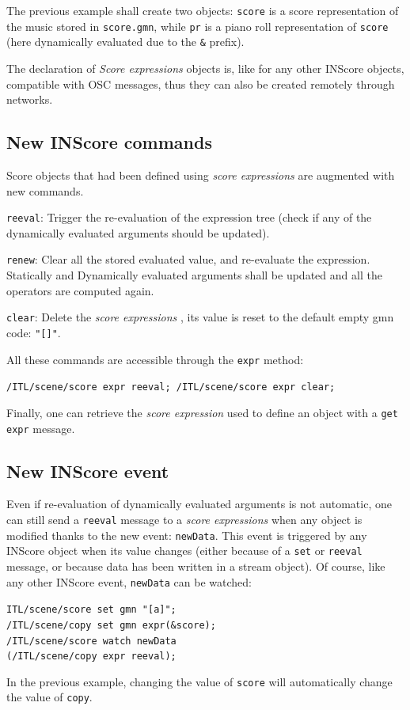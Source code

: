 \documentclass{article}
\newcommand{\OSC}[1]{\texttt{#1}}
\newcommand{\sExpr}{\emph{score expressions} }
\newcommand{\SExpr}{\emph{Score expressions} }
\let\olditemize\itemize
\let\oldenditemize\enditemize
\renewenvironment{itemize} 	{\olditemize \setlength{\itemsep}{1mm}}{\oldenditemize}
\newcommand{\sample}	[1]			{\vspace{-1.8em}\begin{center}\colorbox{mygrey}{\begin{minipage}[t]{1\columnwidth} {\small \texttt{#1}}\end{minipage}}\end{center}}
\begin{document}
The previous example shall create two objects: \OSC{score} is a score representation of the music stored in \OSC{score.gmn}, while \OSC{pr} is a piano roll representation of \OSC{score} (here dynamically evaluated due to the \OSC{\&} prefix).

The declaration of \SExpr objects is, like for any other INScore objects, compatible with OSC messages, thus they can also be created remotely through networks. 

\subsection{New INScore commands}
Score objects that had been defined using \sExpr are augmented with new commands.

\begin{itemize}
\item \OSC{reeval}: Trigger the re-evaluation of the expression tree (check if any of the dynamically evaluated arguments should be updated).
\item \OSC{renew}: Clear all the stored evaluated value, and re-evaluate the expression. Statically and Dynamically evaluated arguments shall be updated and all the operators are computed again.
\item \OSC{clear}: Delete the \sExpr, its value is reset to the default empty gmn code: \OSC{"[]"}.
\end{itemize}

All these commands are accessible through the \OSC{expr} method:\sample{/ITL/scene/score expr reeval;
/ITL/scene/score expr clear;
}

Finally, one can retrieve the \emph{score expression} used to define an object with a \OSC{get expr} message. 

\subsection{New INScore event}

Even if re-evaluation of dynamically evaluated arguments is not automatic, one can still send a \OSC{reeval} message to a \sExpr when any object is modified thanks to the new event: \OSC{newData}.
This event is triggered by any INScore object when its value changes (either because of a \OSC{set} or \OSC{reeval} message, or because data has been written in a stream object). Of course, like any other INScore event, \OSC{newData} can be watched:
\sample{ITL/scene/score set gmn "[a]";\\
/ITL/scene/copy set gmn expr(\&score);\\
/ITL/scene/score watch newData\\   
\hspace*{8mm}(/ITL/scene/copy expr reeval);
}
In the previous example, changing the value of \OSC{score} will automatically change the value of \OSC{copy}.
\end{document}
